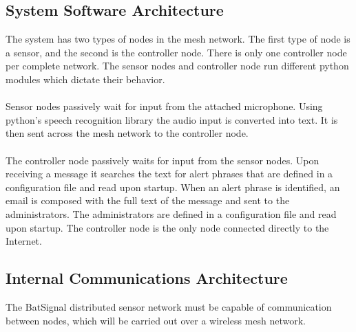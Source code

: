 \documentclass[11pt,a4paper]{article}
\begin{document}
\subsection{System Software Architecture}
The system has two types of nodes in the mesh network.  The first type of node is a sensor, and the second is the controller node.  There is only one controller node per complete network.  The sensor nodes and controller node run different python modules which dictate their behavior. \\\\
Sensor nodes passively wait for input from the attached microphone.  Using python's speech recognition library the audio input is converted into text.  It is then sent across the mesh network to the controller node. \\\\
The controller node passively waits for input from the sensor nodes. Upon receiving a message it searches the text for alert phrases that are defined in a configuration file and read upon startup. When an alert phrase is identified, an email is composed with the full text of the message and sent to the administrators.  The administrators are defined in a configuration file and read upon startup.  The controller node is the only node connected directly to the Internet.


\subsection{Internal Communications Architecture}
The BatSignal distributed sensor network must be capable of communication between nodes, which will be carried out over a wireless mesh network. 
\end{document}
